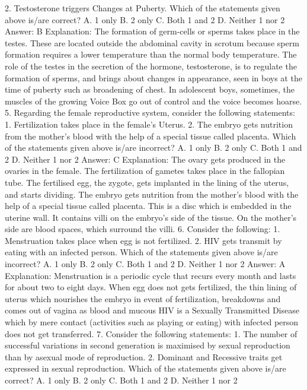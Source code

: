 2. Testosterone triggers Changes at Puberty.
Which of the statements given above is/are correct?
A. 1 only
B. 2 only
C. Both 1 and 2
D. Neither 1 nor 2
Answer: B
Explanation: The formation of germ-cells or sperms takes place in
the testes. These are located outside the abdominal cavity in
scrotum because sperm formation requires a lower temperature than
the normal body temperature.
The role of the testes in the secretion of the hormone,
testosterone, is to regulate the formation of sperms, and brings
about changes in appearance, seen in boys at the time of puberty
such as broadening of chest. In adolescent boys, sometimes, the
muscles of the growing Voice Box go out of control and the voice
becomes hoarse.
5. Regarding the female reproductive system, consider the
following statements:
1. Fertilization takes place in the female's Uterus.
2. The embryo gets nutrition from the mother’s blood with the help
of a special tissue called placenta.
Which of the statements given above is/are incorrect?
A. 1 only
B. 2 only
C. Both 1 and 2
D. Neither 1 nor 2
Answer: C
Explanation: The ovary gets produced in the ovaries in the female.
The fertilization of gametes takes place in the fallopian tube. The
fertilised egg, the zygote, gets implanted in the lining of the uterus,
and starts dividing.
The embryo gets nutrition from the mother’s blood with the help of
a special tissue called placenta. This is a disc which is embedded in
the uterine wall. It contains villi on the embryo’s side of the tissue.
On the mother’s side are blood spaces, which surround the villi.
6. Consider the following:
1. Menstruation takes place when egg is not fertilized.
2. HIV gets transmit by eating with an infected person.
Which of the statements given above is/are incorrect?
A. 1 only
B. 2 only
C. Both 1 and 2
D. Neither 1 nor 2
Answer: A
Explanation: Menstruation is a periodic cycle that recurs every
month and lasts for about two to eight days. When egg does not gets
fertilized, the thin lining of uterus which nourishes the embryo in
event of fertilization, breakdowns and comes out of vagina as blood
and mucous
HIV is a Sexually Transmitted Disease which by mere contact
(activities such as playing or eating) with infected person does not
get transferred.
7. Consider the following statements:
1. The number of successful variations in second generation is
maximised by sexual reproduction than by asexual mode of
reproduction.
2. Dominant and Recessive traits get expressed in sexual
reproduction.
Which of the statements given above is/are correct?
A. 1 only
B. 2 only
C. Both 1 and 2
D. Neither 1 nor 2
